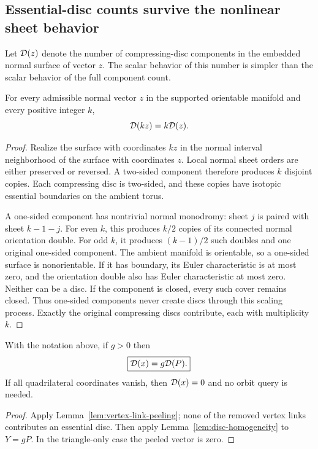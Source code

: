 \subsection{Essential-disc counts survive the nonlinear sheet behavior}

Let $\mathcal D(z)$ denote the number of compressing-disc components in the embedded
normal surface of vector $z$. The scalar behavior of this number is simpler
than the scalar behavior of the full component count.

\begin{lemma}
\label{lem:disc-homogeneity}
For every admissible normal vector $z$ in the supported orientable manifold
and every positive integer $k$,
\[
 \mathcal D(kz)=k\mathcal D(z).
\]
\end{lemma}
\begin{proof}
Realize the surface with coordinates $kz$ in the normal interval
neighborhood of the surface with coordinates $z$. Local normal sheet orders
are either preserved or reversed. A two-sided component therefore produces
$k$ disjoint copies. Each compressing disc is two-sided, and these copies
have isotopic essential boundaries on the ambient torus.

A one-sided component has nontrivial normal monodromy: sheet $j$ is paired
with sheet $k-1-j$. For even $k$, this produces $k/2$ copies of its connected
normal orientation double. For odd $k$, it produces $(k-1)/2$ such doubles
and one original one-sided component. The ambient manifold is orientable,
so a one-sided surface is nonorientable. If it has boundary, its Euler
characteristic is at most zero, and the orientation double also has Euler
characteristic at most zero. Neither can be a disc. If the component is
closed, every such cover remains closed. Thus one-sided components never
create discs through this scaling process. Exactly the original compressing
discs contribute, each with multiplicity $k$.
\end{proof}

\begin{corollary}
\label{cor:core-disc-count}
With the notation above, if $g>0$ then
\[
 \boxed{\mathcal D(x)=g\mathcal D(P).}
\]
If all quadrilateral coordinates vanish, then $\mathcal D(x)=0$ and no orbit query
is needed.
\end{corollary}
\begin{proof}
Apply Lemma~\ref{lem:vertex-link-peeling}; none of the removed vertex links
contributes an essential disc. Then apply Lemma~\ref{lem:disc-homogeneity}
to $Y=gP$. In the triangle-only case the peeled vector is zero.
\end{proof}


